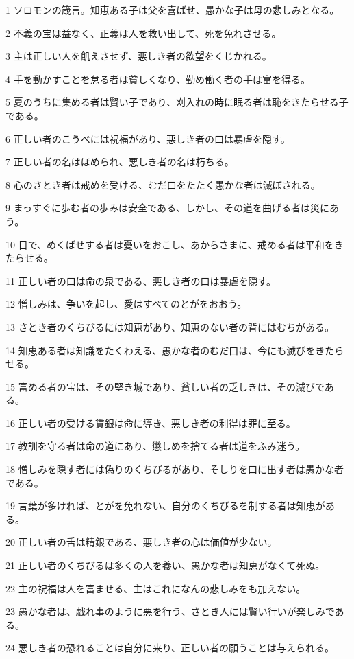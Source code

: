 \par 1 ソロモンの箴言。知恵ある子は父を喜ばせ、愚かな子は母の悲しみとなる。
\par 2 不義の宝は益なく、正義は人を救い出して、死を免れさせる。
\par 3 主は正しい人を飢えさせず、悪しき者の欲望をくじかれる。
\par 4 手を動かすことを怠る者は貧しくなり、勤め働く者の手は富を得る。
\par 5 夏のうちに集める者は賢い子であり、刈入れの時に眠る者は恥をきたらせる子である。
\par 6 正しい者のこうべには祝福があり、悪しき者の口は暴虐を隠す。
\par 7 正しい者の名はほめられ、悪しき者の名は朽ちる。
\par 8 心のさとき者は戒めを受ける、むだ口をたたく愚かな者は滅ぼされる。
\par 9 まっすぐに歩む者の歩みは安全である、しかし、その道を曲げる者は災にあう。
\par 10 目で、めくばせする者は憂いをおこし、あからさまに、戒める者は平和をきたらせる。
\par 11 正しい者の口は命の泉である、悪しき者の口は暴虐を隠す。
\par 12 憎しみは、争いを起し、愛はすべてのとがをおおう。
\par 13 さとき者のくちびるには知恵があり、知恵のない者の背にはむちがある。
\par 14 知恵ある者は知識をたくわえる、愚かな者のむだ口は、今にも滅びをきたらせる。
\par 15 富める者の宝は、その堅き城であり、貧しい者の乏しきは、その滅びである。
\par 16 正しい者の受ける賃銀は命に導き、悪しき者の利得は罪に至る。
\par 17 教訓を守る者は命の道にあり、懲しめを捨てる者は道をふみ迷う。
\par 18 憎しみを隠す者には偽りのくちびるがあり、そしりを口に出す者は愚かな者である。
\par 19 言葉が多ければ、とがを免れない、自分のくちびるを制する者は知恵がある。
\par 20 正しい者の舌は精銀である、悪しき者の心は価値が少ない。
\par 21 正しい者のくちびるは多くの人を養い、愚かな者は知恵がなくて死ぬ。
\par 22 主の祝福は人を富ませる、主はこれになんの悲しみをも加えない。
\par 23 愚かな者は、戯れ事のように悪を行う、さとき人には賢い行いが楽しみである。
\par 24 悪しき者の恐れることは自分に来り、正しい者の願うことは与えられる。
